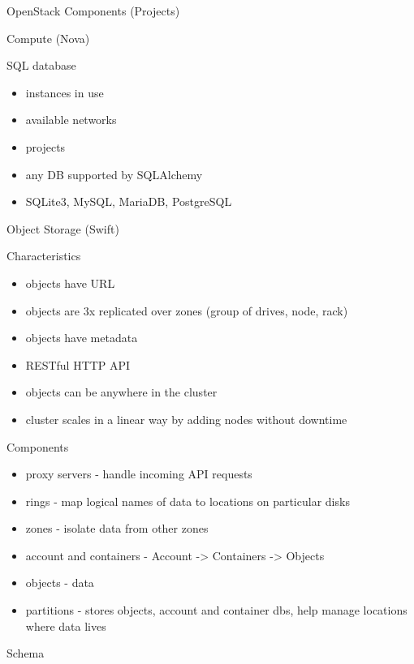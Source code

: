 \documentclass[presentation]{beamer}
\begin{document}
\begin{frame}[fragile,label={sec:orgdf62090}]{OpenStack Components (Projects)}
\begin{block}{Compute (Nova)}
\begin{block}{SQL database}
\begin{itemize}
\item instances in use
\item available networks
\item projects
\item any DB supported by SQLAlchemy
\item SQLite3, MySQL, MariaDB, PostgreSQL
\end{itemize}
\end{block}
\end{block}
\begin{block}{Object Storage (Swift)}
\begin{block}{Characteristics}
\begin{itemize}
\item objects have URL
\item objects are 3x replicated over zones (group of drives, node, rack)
\item objects have metadata
\item RESTful HTTP API
\item objects can be anywhere in the cluster
\item cluster scales in a linear way by adding nodes without downtime
\end{itemize}
\end{block}
\begin{block}{Components}
\begin{itemize}
\item proxy servers - handle incoming API requests
\item rings - map logical names of data to locations on particular disks
\item zones - isolate data from other zones
\item account and containers - Account -> Containers -> Objects
\item objects - data
\item partitions - stores objects, account and container dbs, help manage locations where data lives
\end{itemize}
\end{block}
\begin{block}{Schema}
\begin{center}

\end{center}
\end{block}
\end{block}
\end{frame}
\end{document}
